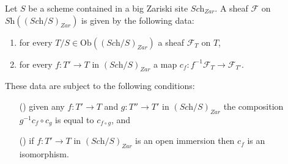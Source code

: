 \begin{lemma}
\label{lemma-characterize-sheaf-big}
Let $S$ be a scheme contained in a big Zariski site $\textit{Sch}_{Zar}$.
A sheaf $\mathcal{F}$ on $\textit{Sh}((\textit{Sch}/S)_{Zar})$
is given by the following data:
\begin{enumerate}
\item for every $T/S \in \text{Ob}((\textit{Sch}/S)_{Zar})$ a sheaf
$\mathcal{F}_T$ on $T$,
\item for every $f : T' \to T$ in
$(\textit{Sch}/S)_{Zar}$ a map
$c_f : f^{-1}\mathcal{F}_{T} \to \mathcal{F}_{T'}$.
\end{enumerate}
These data are subject to the following conditions:
\begin{enumerate}
\item[(\romannumeral1)] given any $f : T' \to T$ and $g : T'' \to T'$ in
$(\textit{Sch}/S)_{Zar}$ the composition $g^{-1}c_f \circ c_g$
is equal to $c_{f \circ g}$, and
\item[(\romannumeral2)] if $f : T' \to T$ in $(\textit{Sch}/S)_{Zar}$ is an
open immersion then $c_f$ is an isomorphism.
\end{enumerate}
\end{lemma}

